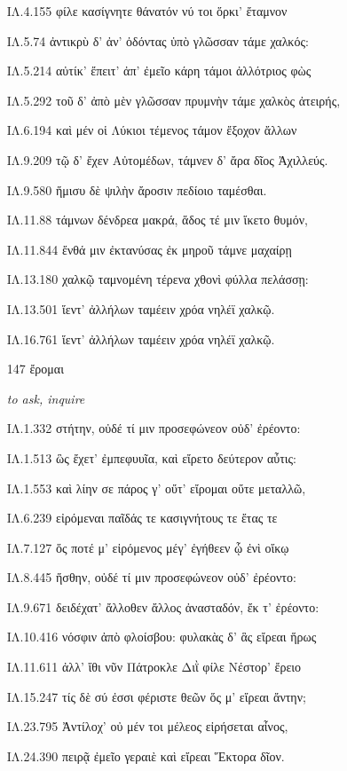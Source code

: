\begin{enumerate}
{ΙΛ.4.155 φίλε κασίγνητε θάνατόν νύ τοι ὅρκι' ἔταμνον

ΙΛ.5.74 ἀντικρὺ δ' ἀν' ὀδόντας ὑπὸ γλῶσσαν τάμε χαλκός:

ΙΛ.5.214 αὐτίκ' ἔπειτ' ἀπ' ἐμεῖο κάρη τάμοι ἀλλότριος φὼς

ΙΛ.5.292 τοῦ δ' ἀπὸ μὲν γλῶσσαν πρυμνὴν τάμε χαλκὸς ἀτειρής,

ΙΛ.6.194 καὶ μέν οἱ Λύκιοι τέμενος τάμον ἔξοχον ἄλλων

ΙΛ.9.209 τῷ δ' ἔχεν Αὐτομέδων, τάμνεν δ' ἄρα δῖος Ἀχιλλεύς.

ΙΛ.9.580 ἥμισυ δὲ ψιλὴν ἄροσιν πεδίοιο ταμέσθαι.

ΙΛ.11.88 τάμνων δένδρεα μακρά, ἅδος τέ μιν ἵκετο θυμόν,

ΙΛ.11.844 ἔνθά μιν ἐκτανύσας ἐκ μηροῦ τάμνε μαχαίρῃ

ΙΛ.13.180 χαλκῷ ταμνομένη τέρενα χθονὶ φύλλα πελάσσῃ:

ΙΛ.13.501 ἵεντ' ἀλλήλων ταμέειν χρόα νηλέϊ χαλκῷ.

ΙΛ.16.761 ἵεντ' ἀλλήλων ταμέειν χρόα νηλέϊ χαλκῷ.

}

\clearpage
\item[\large 147]{\large \g ἔρομαι	}

\hspace{0.2cm} \textit{ to ask, inquire }

{\g
ΙΛ.1.332 στήτην, οὐδέ τί μιν προσεφώνεον οὐδ' ἐρέοντο:

ΙΛ.1.513 ὣς ἔχετ' ἐμπεφυυῖα, καὶ εἴρετο δεύτερον αὖτις:

ΙΛ.1.553 καὶ λίην σε πάρος γ' οὔτ' εἴρομαι οὔτε μεταλλῶ,

ΙΛ.6.239 εἰρόμεναι παῖδάς τε κασιγνήτους τε ἔτας τε

ΙΛ.7.127 ὅς ποτέ μ' εἰρόμενος μέγ' ἐγήθεεν ᾧ ἐνὶ οἴκῳ

ΙΛ.8.445 ἥσθην, οὐδέ τί μιν προσεφώνεον οὐδ' ἐρέοντο:

ΙΛ.9.671 δειδέχατ' ἄλλοθεν ἄλλος ἀνασταδόν, ἔκ τ' ἐρέοντο:

ΙΛ.10.416 νόσφιν ἀπὸ φλοίσβου: φυλακὰς δ' ἃς εἴρεαι ἥρως

ΙΛ.11.611 ἀλλ' ἴθι νῦν Πάτροκλε Διῒ φίλε Νέστορ' ἔρειο

ΙΛ.15.247 τίς δὲ σύ ἐσσι φέριστε θεῶν ὅς μ' εἴρεαι ἄντην;

ΙΛ.23.795 Ἀντίλοχ' οὐ μέν τοι μέλεος εἰρήσεται αἶνος,

ΙΛ.24.390 πειρᾷ ἐμεῖο γεραιὲ καὶ εἴρεαι Ἕκτορα δῖον.

}
\end{enumerate}
